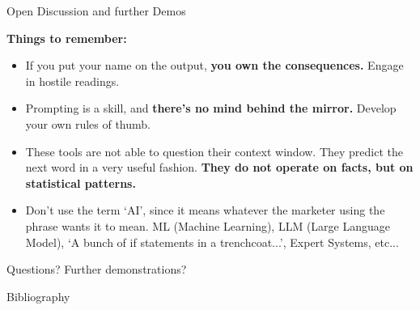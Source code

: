 \documentclass[aspectratio=169]{beamer}
\begin{document}
\begin{frame}{Open Discussion and further Demos}

\textbf{Things to remember:}
\begin{itemize}
    \item If you put your name on the output, \textbf{you own the consequences.} Engage in hostile readings.
    \item Prompting is a skill, and \textbf{there's no mind behind the mirror.} Develop your own rules of thumb.
    \item These tools are not able to question their context window. They predict the next word in a very useful fashion. \textbf{They do not operate on facts, but on statistical patterns.}
    \item Don't use the term `AI', since it means whatever the marketer using the phrase wants it to mean. ML (Machine Learning), LLM (Large Language Model), `A bunch of if statements in a trenchcoat...', Expert Systems, etc... 
\end{itemize}

\vspace{1em}
Questions?  Further demonstrations?



    
\end{frame}

\begin{frame}{Bibliography}
\printbibliography[heading=none]
    
\end{frame}
\end{document}
